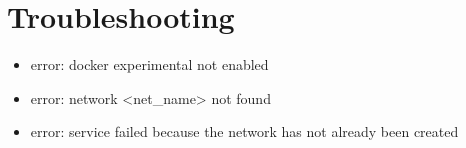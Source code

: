 \section{Troubleshooting}

\begin{itemize}

\item error: docker experimental not enabled

\item error: network <net_name> not found

\item error: service failed because the network has not already been created

\end{itemize}
